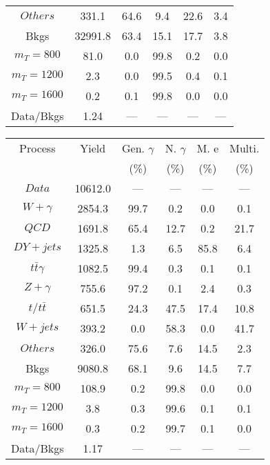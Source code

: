 \begin{figure}
\begin{minipage}[c]{0.32\textwidth}
{\begin{tabular}{cccccc}
$ Others $ &  331.1 &  64.6 &  9.4 &  22.6 &  3.4\\
Bkgs &  32991.8 &  63.4 &  15.1 &  17.7 &  3.8\\
$ m_{T} = 800 $ &  81.0 &  0.0 &  99.8 &  0.2 &  0.0\\
$ m_{T} = 1200 $ &  2.3 &  0.0 &  99.5 &  0.4 &  0.1\\
$ m_{T} = 1600 $ &  0.2 &  0.1 &  99.8 &  0.0 &  0.0\\
Data/Bkgs &  1.24 &  --- &  --- &  --- &  ---\\
\hline
\end{tabular}
}
\end{minipage}
\begin{minipage}[c]{0.32\textwidth}
\centering
\tiny{
\begin{tabular}{cccccc}
\hline
Process & Yield & Gen. $\gamma$ & N. $\gamma$ & M. e & Multi. \\
 &  & (\%) & (\%) & (\%) & (\%)  \\
\hline
                                                                      $ Data $ &  10612.0 &  --- &  --- &  --- &  ---\\
$ W+\gamma $ &  2854.3 &  99.7 &  0.2 &  0.0 &  0.1\\
$ QCD $ &  1691.8 &  65.4 &  12.7 &  0.2 &  21.7\\
$ DY+jets $ &  1325.8 &  1.3 &  6.5 &  85.8 &  6.4\\
$ t\bar{t}\gamma $ &  1082.5 &  99.4 &  0.3 &  0.1 &  0.1\\
$ Z+\gamma $ &  755.6 &  97.2 &  0.1 &  2.4 &  0.3\\
$ t/t\bar{t} $ &  651.5 &  24.3 &  47.5 &  17.4 &  10.8\\
$ W+jets $ &  393.2 &  0.0 &  58.3 &  0.0 &  41.7\\
$ Others $ &  326.0 &  75.6 &  7.6 &  14.5 &  2.3\\
Bkgs &  9080.8 &  68.1 &  9.6 &  14.5 &  7.7\\
$ m_{T} = 800 $ &  108.9 &  0.2 &  99.8 &  0.0 &  0.0\\
$ m_{T} = 1200 $ &  3.8 &  0.3 &  99.6 &  0.1 &  0.1\\
$ m_{T} = 1600 $ &  0.3 &  0.2 &  99.7 &  0.1 &  0.0\\
Data/Bkgs &  1.17 &  --- &  --- &  --- &  ---\\
\hline
\end{tabular}
}
\end{minipage}
\begin{minipage}[c]{0.32\textwidth}
\centering

\end{minipage}
\end{figure}
